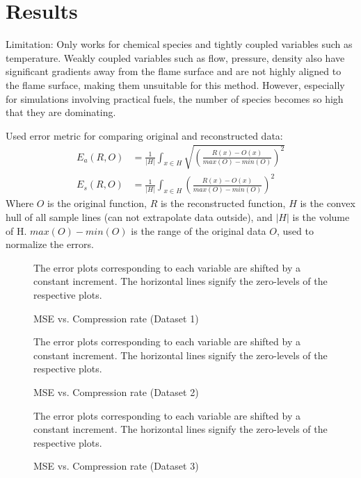 

\section{Results}
\label{sec:sr_results}

Limitation: Only works for chemical species and tightly coupled variables such
as temperature. Weakly coupled variables such as flow, pressure, density also
have significant gradients away from the flame surface and are not highly
aligned to the flame surface, making them unsuitable for this method. However,
especially for simulations involving practical fuels, the number of species
becomes so high that they are dominating.

Used error metric for comparing original and reconstructed data:
\begin{align}
    E_a(R, O) &= \frac{1}{|H|}\int_{x \in H} \sqrt{\left(\frac{R(x) - O(x)}{max(O)-min(O)}\right)^2}\\
    E_s(R, O) &= \frac{1}{|H|}\int_{x \in H} \left(\frac{R(x) - O(x)}{max(O)-min(O)}\right)^2
\end{align}
Where $O$ is the original function, $R$ is the reconstructed function, $H$ is 
the convex hull of all sample lines (can not extrapolate data outside), 
and $|H|$ is the volume of H. $max(O)-min(O)$ is the range of the original data 
$O$, used to normalize the errors.

\begin{figure}
	\centering
	\setlength\figureheight{12cm} 
	\setlength\figurewidth{6cm}
	
	\caption{MSE vs. Compression rate (Dataset 1)}
	The error plots corresponding to each variable are shifted by a constant
	increment. The horizontal lines signify the zero-levels of the respective 
	plots.
	\label{fig:CRvMSE}
\end{figure}

\begin{figure}
	\centering
	\setlength\figureheight{6cm} 
	\setlength\figurewidth{6cm}
	
	\caption{MSE vs. Compression rate (Dataset 2)}
	The error plots corresponding to each variable are shifted by a constant
	increment. The horizontal lines signify the zero-levels of the respective 
	plots.
	\label{fig:CRvMSE2}
\end{figure}

\begin{figure}
	\centering
	\setlength\figureheight{12cm} 
	\setlength\figurewidth{6cm}
	
	\caption{MSE vs. Compression rate (Dataset 3)}
	The error plots corresponding to each variable are shifted by a constant
	increment. The horizontal lines signify the zero-levels of the respective 
	plots.
	\label{fig:CRvMSE3}
\end{figure}

